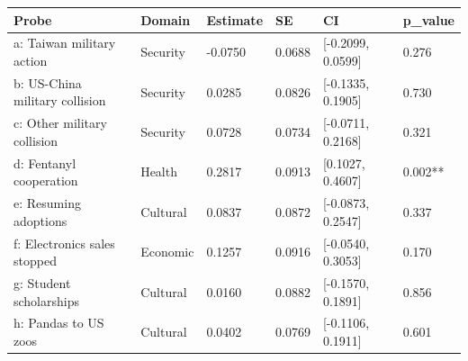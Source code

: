 
\begin{tabular}[t]{llllll}
\toprule
Probe & Domain & Estimate & SE & CI & p\_value\\
\midrule
a: Taiwan military action & Security & -0.0750 & 0.0688 & {}[-0.2099, 0.0599] & 0.276\\
b: US-China military collision & Security & 0.0285 & 0.0826 & {}[-0.1335, 0.1905] & 0.730\\
c: Other military collision & Security & 0.0728 & 0.0734 & {}[-0.0711, 0.2168] & 0.321\\
d: Fentanyl cooperation & Health & 0.2817 & 0.0913 & {}[0.1027, 0.4607] & 0.002**\\
e: Resuming adoptions & Cultural & 0.0837 & 0.0872 & {}[-0.0873, 0.2547] & 0.337\\
f: Electronics sales stopped & Economic & 0.1257 & 0.0916 & {}[-0.0540, 0.3053] & 0.170\\
g: Student scholarships & Cultural & 0.0160 & 0.0882 & {}[-0.1570, 0.1891] & 0.856\\
h: Pandas to US zoos & Cultural & 0.0402 & 0.0769 & {}[-0.1106, 0.1911] & 0.601\\
\bottomrule
\end{tabular}
